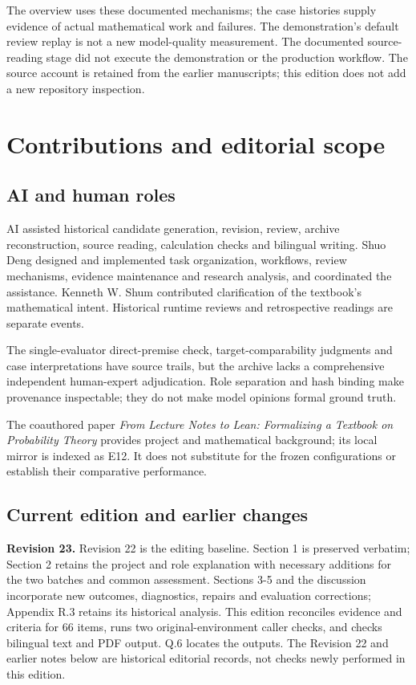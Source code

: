 The overview uses these documented mechanisms; the case histories supply evidence of actual mathematical work and failures. The demonstration's default review replay is not a new model-quality measurement. The documented source-reading stage did not execute the demonstration or the production workflow. The source account is retained from the earlier manuscripts; this edition does not add a new repository inspection.

\section[Contributions and editorial scope]{\texorpdfstring{\protect\hypertarget{appendix-f}{}Contributions and editorial scope}{Contributions and editorial scope}}
\subsection[AI and human roles]{\texorpdfstring{\protect\hypertarget{f1}{}AI and human roles}{AI and human roles}}
AI assisted historical candidate generation, revision, review, archive reconstruction, source reading, calculation checks and bilingual writing. Shuo Deng designed and implemented task organization, workflows, review mechanisms, evidence maintenance and research analysis, and coordinated the assistance. Kenneth W. Shum contributed clarification of the textbook's mathematical intent. Historical runtime reviews and retrospective readings are separate events.

The single-evaluator direct-premise check, target-comparability judgments and case interpretations have source trails, but the archive lacks a comprehensive independent human-expert adjudication. Role separation and hash binding make provenance inspectable; they do not make model opinions formal ground truth.

The coauthored paper \emph{From Lecture Notes to Lean: Formalizing a Textbook on Probability Theory} provides project and mathematical background; its local mirror is indexed as E12. It does not substitute for the frozen configurations or establish their comparative performance.

\subsection[Current edition and earlier changes]{\texorpdfstring{\protect\hypertarget{f2}{}Current edition and earlier changes}{Current edition and earlier changes}}
\textbf{Revision 23.} Revision 22 is the editing baseline. Section 1 is preserved verbatim; Section 2 retains the project and role explanation with necessary additions for the two batches and common assessment. Sections 3-5 and the discussion incorporate new outcomes, diagnostics, repairs and evaluation corrections; Appendix R.3 retains its historical analysis. This edition reconciles evidence and criteria for 66 items, runs two original-environment caller checks, and checks bilingual text and PDF output. Q.6 locates the outputs. The Revision 22 and earlier notes below are historical editorial records, not checks newly performed in this edition.

